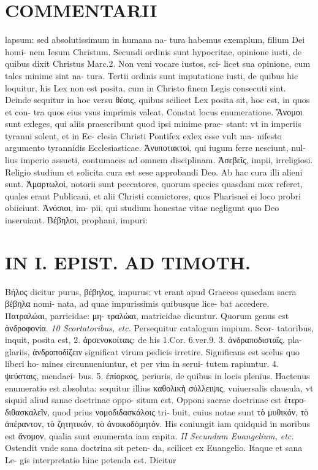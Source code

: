 \documentclass{article}
\begin{document}
\begin{pages}
\section*{COMMENTARII }
\marginpar{[ p.28 ]}\pstart lapsum: sed absolutissimum in humana na- tura habemus exemplum, filium Dei homi- nem Iesum Christum. Secundi ordinis sunt hypocritae, opinione iusti, de quibus dixit Christus Marc.2. Non veni vocare iustos, sci- licet sua opinione, cum tales minime sint na- tura. Tertii ordinis sunt imputatione iusti, de quibus hic loquitur, his Lex non est posita, cum in Christo finem Legis consecuti sint.  \pend\pstart Deinde sequitur in hoc versu θέσις, quibus scilicet Lex posita sit, hoc est, in quos et con- tra quos eius vsus imprimis valeat. Constat locus enumeratione. Ἄνομοι sunt exleges, qui aliis praescribunt quod ipsi minime prae- stant: vt in imperiis tyranni solent, et in Ec- clesia Christi Pontifex exlex esse vult ma- nifesto argumento tyrannidis Ecclesiasticae.  \pend\pstart Ἀνυποτακτοὶ, qui iugum ferre nesciunt, nul- lius imperio assueti, contumaces ad omnem disciplinam.  \pend\pstart Ἀσεβεῖς, impii, irreligiosi. Religio studium et solicita cura est sese approbandi Deo. Ab hac cura illi alieni sunt.  \pend\pstart Ἁμαρτωλοὶ, notorii sunt peccatores, quorum species quasdam mox referet, quales erant Publicani, et alii Christi conuictores, quos Pharisaei ei loco probri obiiciunt. Ἀνόσιοι, im- pii, qui studium honestae vitae negligunt quo Deo inseruiant. Βέβηλοι, prophani, impuri:  \pend
\section*{IN I. EPIST. AD TIMOTH. }
\marginpar{[ p.29 ]}\pstart Βήλος dicitur purus, βέβηλος, impurus: vt erant apud Graecos quaedam sacra βέβηλα nomi- nata, ad quae impurissimis quibusque lice- bat accedere. Πατραλώαι, parricidae: μη- τραλώαι, matricidae dicuntur. Quorum genus est ἀνδροφονία.  \pend
\textit{10 Scortatoribus, etc. }\pstart Persequitur catalogum impium. Scor- tatoribus, inquit, posita est, 2. ἀρσενοκοίταις: de his 1.Cor. 6.ver.9. 3. ἀνδραποδισταῖς, pla- glariis, ἀνδραποδίζειν significat virum pedicis irretire. Significans est scelus quo liberi ho- mines circunueniuntur, et per vim in serui- tutem rapiuntur. 4. ψεύσταις, mendaci- bus. 5. ἐπίορκος, periuris, de quibus in locis plenius. Hactenus enumeratio est absoluta: sequitur illius καθολικὴ σύλλειψις, vniuersalis clausula, vt siquid aliud sanae doctrinae oppo- situm est. Opponi sacrae doctrinae est ἑτερο- διθασκαλεῖν, quod prius νομοδιδασκάλοις tri- buit, cuius notae sunt τὸ μυθικόν, τὸ ἀπέραντον, τὸ  ζητητικόν, τὸ ἀνοικοδόμητόν. His coniungit iam quidquid in moribus est ἄνομον, qualia sunt enumerata iam capita.  \pend
\textit{II Secundum Euangelium, etc. }\pstart Ostendit vnde sana doctrina sit peten- da, scilicet ex Euangelio. Itaque et sana Le- gis interpretatio hinc petenda est. Dicitur  \pend

\end{pages}
\end{document}
